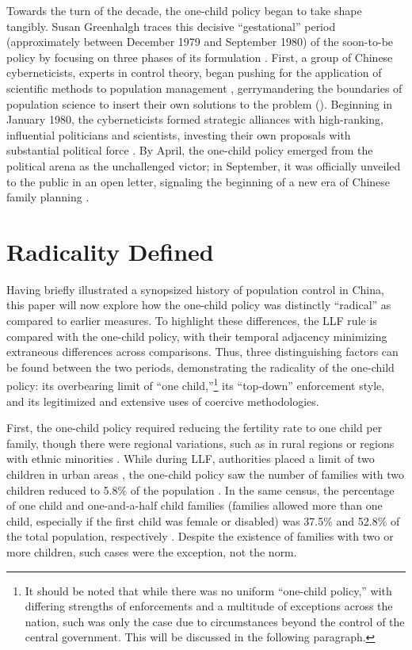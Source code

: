 Towards the turn of the decade, the one-child policy began to take shape tangibly. Susan Greenhalgh traces this decisive “gestational” period (approximately between December 1979 and September 1980) of the soon-to-be policy by focusing on three phases of its formulation \autocite[p.\ 198]{Greenhalgh2008JustOneChild}. First, a group of Chinese cyberneticists, experts in control theory, began pushing for the application of scientific methods to population management \autocite[pp.\ 211--223]{Greenhalgh2008JustOneChild}, gerrymandering the boundaries of population science to insert their own solutions to the problem (\cites[p.\ 195]{Greenhalgh2008JustOneChild}[pp.\ 1--35]{Gieryn1999}). Beginning in January 1980, the cyberneticists formed strategic alliances with high-ranking, influential politicians and scientists, investing their own proposals with substantial political force \autocite[chap.\ 7]{Greenhalgh2008JustOneChild}. By April, the one-child policy emerged from the political arena as the unchallenged victor; in September, it was officially unveiled to the public in an open letter, signaling the beginning of a new era of Chinese family planning \autocite[pp.\ 298--299]{Greenhalgh2008JustOneChild}.

\section{Radicality Defined}

Having briefly illustrated a synopsized history of population control in China, this paper will now explore how the one-child policy was distinctly “radical” as compared to earlier measures. To highlight these differences, the LLF rule is compared with the one-child policy, with their temporal adjacency minimizing extraneous differences across comparisons. Thus, three distinguishing factors can be found between the two periods, demonstrating the radicality of the one-child policy: its overbearing limit of “one child,”\footnote{It should be noted that while there was no uniform “one-child policy,” with differing strengths of enforcements and a multitude of exceptions across the nation, such was only the case due to circumstances beyond the control of the central government. This will be discussed in the following paragraph.} its “top-down” enforcement style, and its legitimized and extensive uses of coercive methodologies.

First, the one-child policy required reducing the fertility rate to one child per family, though there were regional variations, such as in rural regions or regions with ethnic minorities \autocite[pp.\ 373--387]{ShortZhai1998}. While during LLF, authorities placed a limit of two children in urban areas \autocite[p.\ 586]{BongaartsGreenhalgh1985}, the one-child policy saw the number of families with two children reduced to 5.8\% of the population \autocite{Xinhua2013BackgroundBirthPolicy}. In the same census, the percentage of one child and one-and-a-half child families (families allowed more than one child, especially if the first child was female or disabled) was 37.5\% and 52.8\% of the total population, respectively \autocite{Xinhua2013BackgroundBirthPolicy}. Despite the existence of families with two or more children, such cases were the exception, not the norm.

